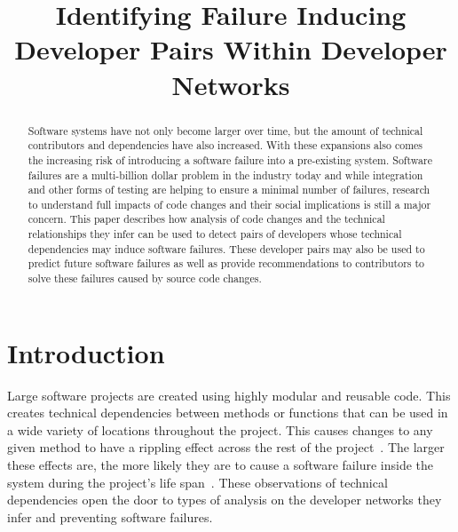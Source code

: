 \documentclass[conference]{IEEEtran}
\begin{document}
\title{Identifying Failure Inducing Developer Pairs Within Developer Networks}

\author{
}

\maketitle


\begin{abstract}
Software systems have not only become larger over time, but the amount of
technical contributors and dependencies have also increased. With these expansions also comes
the increasing risk of introducing a software failure into a pre-existing system.
Software failures are a multi-billion dollar problem in the industry today and while integration and
other forms of testing are helping to ensure a minimal number of failures, research to understand
full impacts of code changes and their social implications is still a major concern. This paper describes
how analysis of code changes and the technical relationships they infer can be used to detect pairs
of developers whose technical dependencies may induce software failures. These developer pairs may
also be used to predict future software failures as well as provide recommendations to contributors
to solve these failures caused by source code changes.
\end{abstract}


\section{Introduction}

Large software projects are created using highly modular and 
reusable code. This creates technical dependencies between methods or functions
that can be used in a wide variety of locations throughout the project. 
This causes changes to any given method to have a rippling 
effect across the rest of the project~\cite{Acharya:2011:PCI}. The larger these effects are,
the more likely they are to cause a software failure inside the system during the project's
life span~\cite{Zimmermann:2008:PDU}. These observations of technical dependencies open
the door to types of analysis on the developer networks they infer and preventing software
failures.
\end{document}
